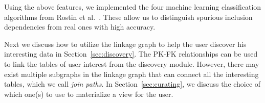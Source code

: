 Using the above features, we implemented the four machine learning classification algorithms from Rostin et al.~\cite{DBLP:conf/webdb/RostinABNL09}. These allow us to distinguish spurious inclusion dependencies from real ones with high accuracy. 

Next we discuss how to utilize the linkage graph to help the user discover his interesting data in Section~\ref{sec:discovery}. The PK-FK relationships can be used to link the tables of user interest from the discovery module. However, there may exist multiple subgraphs in the linkage graph that can connect all the interesting tables, which we call \emph{join paths}. In Section~\ref{sec:curating}, we discuss the choice of which one(s) to use to materialize a view for the user.

